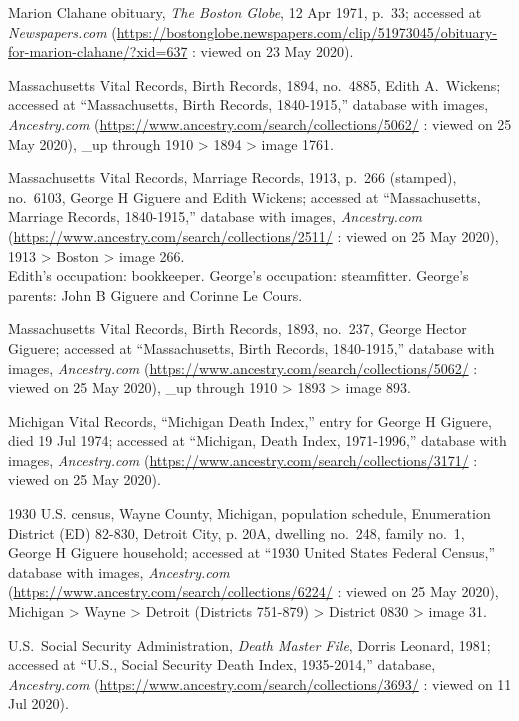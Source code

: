 \begin{thebibliography}{999}
	Marion Clahane obituary, \textit{The Boston Globe}, 12 Apr 1971, p.\ 33; accessed at \textit{Newspapers.com} (\url{https://bostonglobe.newspapers.com/clip/51973045/obituary-for-marion-clahane/?xid=637} : viewed on 23 May 2020).
	
	Massachusetts Vital Records, Birth Records, 1894, no.\ 4885, Edith A.\ Wickens; accessed at ``Massachusetts, Birth Records, 1840-1915,'' database with images, \textit{Ancestry.com} (\url{https://www.ancestry.com/search/collections/5062/} : viewed on 25 May 2020), \_up through 1910 > 1894 > image 1761.
	
	Massachusetts Vital Records, Marriage Records, 1913, p.\ 266 (stamped), no.\ 6103, George H Giguere and Edith Wickens; accessed at ``Massachusetts, Marriage Records, 1840-1915,'' database with images, \textit{Ancestry.com} (\url{https://www.ancestry.com/search/collections/2511/} : viewed on 25 May 2020), 1913 > Boston > image 266.\\
	Edith's occupation: bookkeeper. George's occupation: steamfitter. George's parents: John B Giguere and Corinne Le Cours.
	
	Massachusetts Vital Records, Birth Records, 1893, no.\  237, George Hector Giguere; accessed at ``Massachusetts, Birth Records, 1840-1915,'' database with images, \textit{Ancestry.com} (\url{https://www.ancestry.com/search/collections/5062/} : viewed on 25 May 2020), \_up through 1910 > 1893 > image 893.
	
	Michigan Vital Records, ``Michigan Death Index,'' entry for George H Giguere, died 19 Jul 1974; accessed at ``Michigan, Death Index, 1971-1996,'' database with images, \textit{Ancestry.com} (\url{https://www.ancestry.com/search/collections/3171/} : viewed on 25 May 2020).
	
	1930 U.S. census, Wayne County, Michigan, population schedule, Enumeration District (ED) 82-830, Detroit City, p. 20A, dwelling no.\ 248, family no.\ 1, George H Giguere household; accessed at ``1930 United States Federal Census,'' database with images, \textit{Ancestry.com} (\url{https://www.ancestry.com/search/collections/6224/} : viewed on 25 May 2020), Michigan > Wayne > Detroit (Districts 751-879) > District 0830 > image 31.
	
	U.S.\ Social Security Administration, \textit{Death Master File}, Dorris Leonard, 1981; accessed at ``U.S., Social Security Death Index, 1935-2014,'' database, \textit{Ancestry.com} (\url{https://www.ancestry.com/search/collections/3693/} : viewed on 11 Jul 2020).
	

\end{thebibliography}
